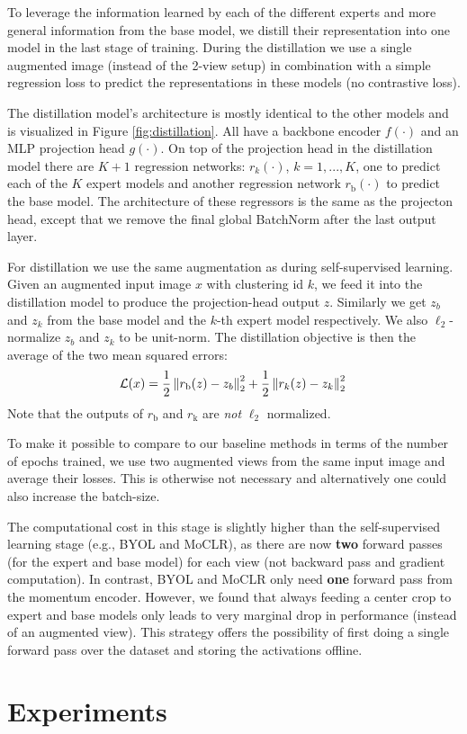 \documentclass[final]{cvpr}
\newcommand{\normtwo}[1]{\left\|#1\right\|_2}
\newcommand\baseline{MoCLR}
\begin{document}
To leverage the information learned by each of the different experts and more general information from the base model, we distill their representation into one model in the last stage of training. During the distillation we use a single augmented image (instead of the 2-view setup) in combination with a simple regression loss to predict the representations in these models (no contrastive loss).

The distillation model's architecture is mostly identical to the other models and is visualized in Figure \ref{fig:distillation}. All have a backbone encoder $f(\cdot)$ and an MLP projection head $g(\cdot)$. On top of the projection head in the distillation model there are $K + 1$ regression networks: $r_k(\cdot)$, $k=1,...,K$, one to predict each of the $K$ expert models and another regression network $r_\text{b}(\cdot)$ to predict the base model. The architecture of these regressors is the same as the projecton head, except that we remove the final global BatchNorm after the last output layer.

For distillation we use the same augmentation as during self-supervised learning. Given an augmented input image $x$ with clustering id $k$, we feed it into the distillation model to produce the projection-head output $z$. Similarly we get $z_{b}$ and $z_{k}$ from the base model and the $k$-th expert model respectively. We also $\ell_2$-normalize $z_{b}$ and $z_{k}$ to be unit-norm. The distillation objective is then the average of the two mean squared errors:
\vspace{-3pt}
\begin{equation}\label{eq:distill_loss}
\mathcal{L}(x) = \frac{1}{2}\normtwo{r_\text{b}(z) - z_b}^2 + \frac{1}{2}\normtwo{r_k(z) - z_k}^2 \\
\vspace{-3pt}
\end{equation}
Note that the outputs of $r_\text{b}$ and $r_\text{k}$ are \emph{not} $\ell_2$ normalized. 

To make it possible to compare to our baseline methods in terms of the number of epochs trained, we use two augmented views from the same input image and average their losses. This is otherwise not necessary and alternatively one could also increase the batch-size.

The computational cost in this stage is slightly higher than the self-supervised learning stage (e.g., BYOL and \baseline{}), as there are now \textbf{two} forward passes (for the expert and base model) for each view (not backward pass and gradient computation). In contrast, BYOL and \baseline{} only need \textbf{one} forward pass from the momentum encoder. However, we found that always feeding a center crop to expert and base models only leads to very marginal drop in performance (instead of an augmented view). This strategy offers the possibility of first doing a single forward pass over the dataset and storing the activations offline. \section{Experiments}
\end{document}

